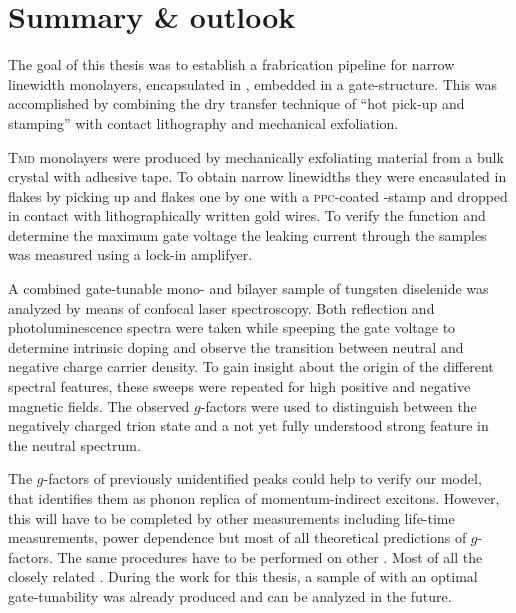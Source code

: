 \chapter{Summary \& outlook}

The goal of this thesis was to establish a frabrication pipeline for narrow linewidth \tmdg monolayers, encapsulated in \hbn, embedded in a gate-structure. This was accomplished by combining the dry transfer technique of ``hot pick-up and stamping'' with contact lithography and mechanical exfoliation.

\textsc{Tmd} monolayers were produced by mechanically exfoliating material from a bulk crystal with adhesive tape. To obtain narrow linewidths they were encasulated in \hbng flakes by picking up \hbng and \tmdg flakes one by one with a \textsc{ppc}-coated \pdms-stamp and dropped in contact with lithographically written gold wires. To verify the function and determine the maximum gate voltage the leaking current through the samples was measured using a lock-in amplifyer.

A combined gate-tunable mono- and bilayer sample of tungsten diselenide was analyzed by means of confocal laser spectroscopy. Both reflection and photoluminescence spectra were taken while speeping the gate voltage to determine intrinsic doping and observe the transition between neutral and negative charge carrier density. To gain insight about the origin of the different spectral features, these sweeps were repeated for high positive and negative magnetic fields. The observed $g$-factors were used to distinguish between the negatively charged trion state and a not yet fully understood strong feature in the neutral spectrum. 

The $g$-factors of previously unidentified peaks could help to verify our model, that identifies them as phonon replica of momentum-indirect excitons. However, this will have to be completed by other measurements including life-time measurements, power dependence but most of all theoretical predictions of $g$-factors. The same procedures have to be performed on other \tmds\!. Most of all the closely related \ws\!. During the work for this thesis, a sample of \ws with an optimal gate-tunability was already produced and can be analyzed in the future.

